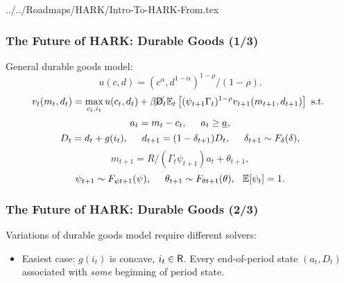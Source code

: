 \documentclass[public]{beamer}\beamerdefaultoverlayspecification{<+->}
\begin{document}
\begin{verbatimwrite}{../../Roadmaps/HARK/Intro-To-HARK-From.tex}
\begin{frame}
    \hyperlink{DiscussionTopics}{}
  \end{frame}


  \begin{frame}\label{DurableGoods}
    \frametitle{The Future of HARK: Durable Goods (1/3)}

    General durable goods model:
    \begin{equation*}
      u(c,d) = (c^\alpha,d^{1-\alpha})^{1-\rho}/(1-\rho).
    \end{equation*}
    \begin{equation*}
      v_t(m_t,d_t) = \max_{c_t,i_t} u(c_t,d_t) + \beta \cancel{\mathsf{D}}_t \mathbb{E}_t \left[(\psi_{t+1} \Gamma_t)^{1-\rho} v_{t+1}(m_{t+1},d_{t+1}) \right] \text{ s.t. }
    \end{equation*}
    \begin{equation*}
      a_t = m_t - c_t, \hspace{0.5cm} a_t \geq \underline{a},
    \end{equation*}
    \begin{equation*}
      D_t = d_t + g(i_t), \hspace{0.5cm} d_{t+1} = (1-\delta_{t+1})D_t, \hspace{0.5cm} \delta_{t+1} \sim F_{\delta}(\delta),
    \end{equation*}
    \begin{equation*}
      m_{t+1} = R/(\Gamma_t \psi_{t+1}) a_t + \theta_{t+1}, 
    \end{equation*}
    \begin{equation*}
      \psi_{t+1} \sim F_{\psi t+1}(\psi), \hspace{0.5cm} \theta_{t+1} \sim F_{\theta t+1}(\theta), \hspace{0.25cm} \mathbb{E}[\psi_t] = 1.
    \end{equation*}
  \end{frame}



  \begin{frame}
    \frametitle{The Future of HARK: Durable Goods (2/3)}
    Variations of durable goods model require different solvers:
    \begin{itemize}
    \item <1-> Easiest case: $g(i_t)$ is concave, $i_t \in \mathsf{R}$.  Every end-of-period state $(a_t,D_t)$ associated with \textit{some} beginning of period state.


\end{itemize}
\end{frame}
\end{verbatimwrite}
\end{document}
